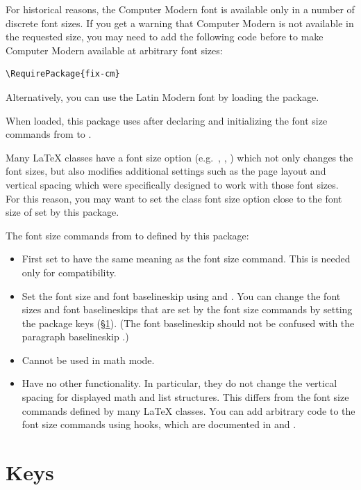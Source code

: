 \documentclass{beerydoc}
\begin{document}
For historical reasons, the Computer Modern font is available only in a number
of discrete font sizes.
If you get a warning that Computer Modern is not available in the requested
size, you may need to add the following code before  to make
Computer Modern available at arbitrary font sizes:
\begin{verbatim}
\RequirePackage{fix-cm}
\end{verbatim}
Alternatively, you can use the Latin Modern font by loading the 
package.

When loaded, this package uses  after declaring and
initializing the font size commands from  to .

Many \LaTeX{} classes have a font size option (e.g.\ \key{10pt}, \key{11pt},
\key{12pt}) which not only changes the font sizes, but also modifies
additional settings such as the page layout and vertical spacing which were
specifically designed to work with those font sizes.
For this reason, you may want to set the class font size option close to the
font size of  set by this package.

\listheading
  {The font size commands from  to  defined by this package:}
\begin{itemize}
  \item
  First set  to have the same meaning as the font size command.
  This is needed only for compatibility.
  \item
  Set the font size and font baselineskip using  and
  .
  You can change the font sizes and font baselineskips that are set by the
  font size commands by setting the  package keys
  (\S\ref{sec:keys}).
  (The font baselineskip should not be confused with the paragraph
  baselineskip .)
  \item
  Cannot be used in math mode.
  \item
  Have no other functionality.
  In particular, they do not change the vertical spacing for displayed math
  and list structures.
  This differs from the font size commands defined by many \LaTeX{} classes.
  You can add arbitrary code to the font size commands using hooks, which are
  documented in  and .
\end{itemize}




\section{Keys}
\label{sec:keys}
\end{document}
